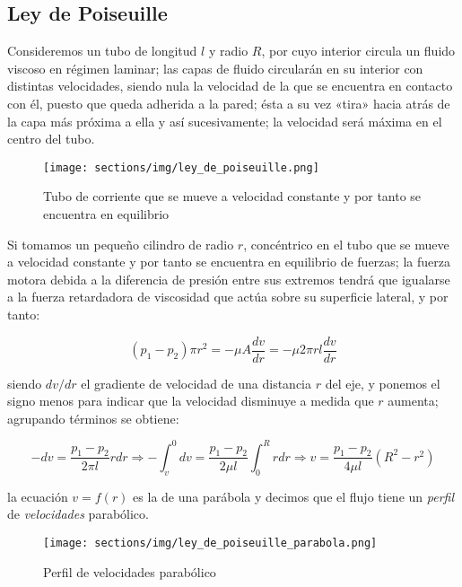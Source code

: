 \subsection{Ley de Poiseuille}
Consideremos un tubo de longitud $l$ y radio $R$, por cuyo interior
circula un fluido viscoso en régimen laminar; las capas de fluido
circularán en su interior con distintas velocidades,
siendo nula la velocidad de la que se encuentra en contacto con él,
puesto que queda adherida a la pared; ésta a su vez «tira» hacia atrás
de la capa más próxima a ella y así sucesivamente; la velocidad será
máxima en el centro del tubo.

\begin{figure}[ht]
    \begin{center}
        \texttt{[image: sections/img/ley\_de\_poiseuille.png]}
        \caption{Tubo de corriente que se mueve a velocidad
        constante y por tanto se encuentra en equilibrio}
    \end{center}
    
\end{figure}

Si tomamos un pequeño cilindro de radio $r$, concéntrico en el tubo
que se mueve a velocidad constante y por tanto se encuentra en
equilibrio de fuerzas; la fuerza motora debida a la diferencia de
presión entre sus extremos tendrá que igualarse a la fuerza retardadora
de viscosidad que actúa sobre su superficie lateral, y por tanto:

\begin{equation*}
    \left(p_1 - p_2\right)\pi r^2 = -\mu A \frac{dv}{dr} 
    = - \mu 2 \pi r l \frac{dv}{dr}
\end{equation*}

siendo $dv/dr$ el gradiente de velocidad de una distancia $r$
del eje, y ponemos el signo menos para indicar que la velocidad
disminuye a medida que $r$ aumenta; agrupando términos se obtiene:

\begin{equation*}
    -dv=\frac{p_1 - p_2}{2 \pi l}r dr \Rightarrow
    -\int_v^0dv = \frac{p_1-p_2}{2\mu l}\int_0^R rdr \Rightarrow
    v = \frac{p_1 - p_2}{4\mu l}\left(R^2 - r^2\right)
\end{equation*}

la ecuación $v=f(r)$ es la de una parábola y decimos que el flujo
tiene un \textit{perfil} de \textit{velocidades}
parabólico.

\begin{figure}[ht]
    \begin{center}
        \texttt{[image: sections/img/ley\_de\_poiseuille\_parabola.png]}
    \end{center}
    \caption{Perfil de velocidades parabólico}
\end{figure}

